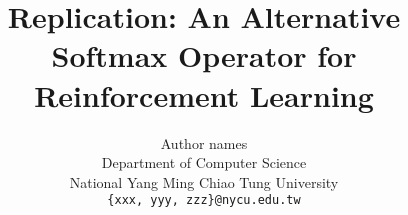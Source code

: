 \documentclass{article}
\title{Replication: An Alternative Softmax Operator for Reinforcement Learning}
\author{%
  Author names\\
  Department of Computer Science\\
  National Yang Ming Chiao Tung University\\
  \texttt{\{xxx, yyy, zzz\}@nycu.edu.tw}
}
\begin{document}
\maketitle











{
\small


}
\end{document}

